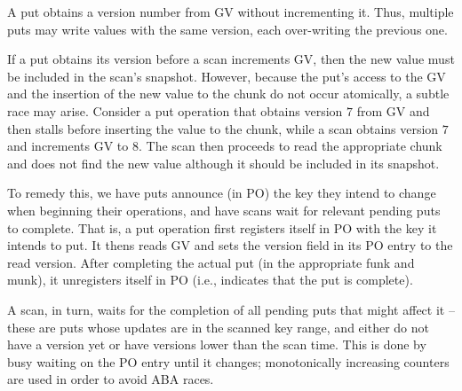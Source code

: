 

A put obtains a version number from GV without incrementing it. Thus, multiple puts may write values with the same version, each over-writing the previous one. 

If a put obtains its version before a scan increments GV, then the new value must be included in the scan's snapshot. 
However, because the put's access to the GV and the insertion of the new value to the chunk do not occur atomically,
a subtle race may arise. Consider a put operation that obtains version $7$ from GV and then stalls before
inserting the value to the chunk, while a scan obtains version $7$ and increments GV to $8$. The scan then proceeds 
to read the appropriate chunk and does not find the new value although it should be included in its snapshot.

To remedy this, we have puts announce (in PO) the key they intend to change when beginning their operations, and have scans wait for relevant pending puts to complete. That is,
a put operation first registers itself in PO with the key it intends to put.
It thens reads GV and sets the version field in its PO entry to the read version. 
After completing the actual put (in the appropriate funk and munk), it unregisters itself in PO (i.e., 
indicates that the put is complete).

A scan, in turn, 
waits for the completion of all pending puts  that might affect it  -- these are puts whose updates 
are in the scanned key range, and either do not have a version yet or have versions lower than the scan time.
This is done by busy waiting on the PO entry until it changes; monotonically increasing counters are used 
in order to avoid ABA races. 

